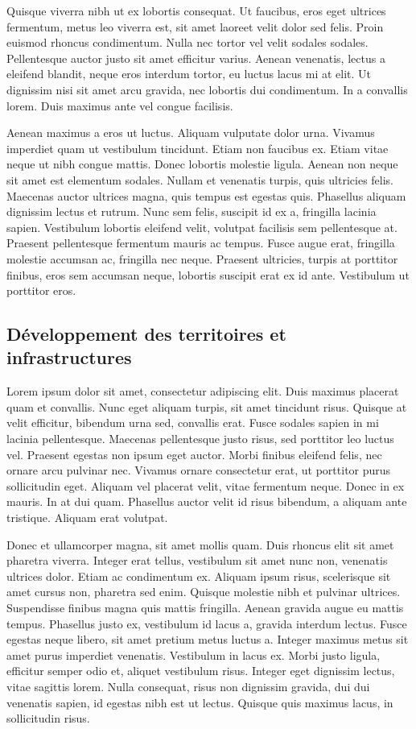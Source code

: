 \documentclass[a4paper,12pt]{report}
\begin{document}
Quisque viverra nibh ut ex lobortis consequat. Ut faucibus, eros eget ultrices fermentum, metus leo viverra est, sit amet laoreet velit dolor sed felis. Proin euismod rhoncus condimentum. Nulla nec tortor vel velit sodales sodales. Pellentesque auctor justo sit amet efficitur varius. Aenean venenatis, lectus a eleifend blandit, neque eros interdum tortor, eu luctus lacus mi at elit. Ut dignissim nisi sit amet arcu gravida, nec lobortis dui condimentum. In a convallis lorem. Duis maximus ante vel congue facilisis.

Aenean maximus a eros ut luctus. Aliquam vulputate dolor urna. Vivamus imperdiet quam ut vestibulum tincidunt. Etiam non faucibus ex. Etiam vitae neque ut nibh congue mattis. Donec lobortis molestie ligula. Aenean non neque sit amet est elementum sodales. Nullam et venenatis turpis, quis ultricies felis. Maecenas auctor ultrices magna, quis tempus est egestas quis. Phasellus aliquam dignissim lectus et rutrum. Nunc sem felis, suscipit id ex a, fringilla lacinia sapien. Vestibulum lobortis eleifend velit, volutpat facilisis sem pellentesque at. Praesent pellentesque fermentum mauris ac tempus. Fusce augue erat, fringilla molestie accumsan ac, fringilla nec neque. Praesent ultricies, turpis at porttitor finibus, eros sem accumsan neque, lobortis suscipit erat ex id ante. Vestibulum ut porttitor eros.

\subsection{Développement des territoires et infrastructures} %
Lorem ipsum dolor sit amet, consectetur adipiscing elit. Duis maximus placerat quam et convallis. Nunc eget aliquam turpis, sit amet tincidunt risus. Quisque at velit efficitur, bibendum urna sed, convallis erat. Fusce sodales sapien in mi lacinia pellentesque. Maecenas pellentesque justo risus, sed porttitor leo luctus vel. Praesent egestas non ipsum eget auctor. Morbi finibus eleifend felis, nec ornare arcu pulvinar nec. Vivamus ornare consectetur erat, ut porttitor purus sollicitudin eget. Aliquam vel placerat velit, vitae fermentum neque. Donec in ex mauris. In at dui quam. Phasellus auctor velit id risus bibendum, a aliquam ante tristique. Aliquam erat volutpat.

Donec et ullamcorper magna, sit amet mollis quam. Duis rhoncus elit sit amet pharetra viverra. Integer erat tellus, vestibulum sit amet nunc non, venenatis ultrices dolor. Etiam ac condimentum ex. Aliquam ipsum risus, scelerisque sit amet cursus non, pharetra sed enim. Quisque molestie nibh et pulvinar ultrices. Suspendisse finibus magna quis mattis fringilla. Aenean gravida augue eu mattis tempus. Phasellus justo ex, vestibulum id lacus a, gravida interdum lectus. Fusce egestas neque libero, sit amet pretium metus luctus a. Integer maximus metus sit amet purus imperdiet venenatis. Vestibulum in lacus ex. Morbi justo ligula, efficitur semper odio et, aliquet vestibulum risus. Integer eget dignissim lectus, vitae sagittis lorem. Nulla consequat, risus non dignissim gravida, dui dui venenatis sapien, id egestas nibh est ut lectus. Quisque quis maximus lacus, in sollicitudin risus.
\end{document}

